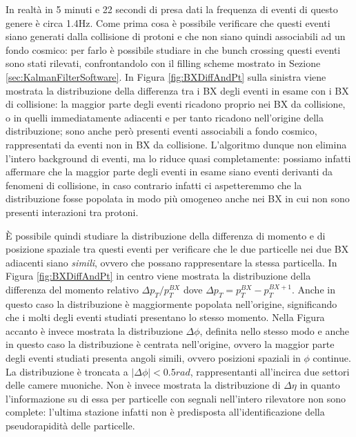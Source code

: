 In realtà in 5 minuti e 22 secondi di presa dati la frequenza di eventi di questo genere è circa 1.4Hz. Come prima cosa è possibile verificare che questi eventi siano generati dalla collisione di protoni e che non siano quindi associabili ad un fondo cosmico: per farlo è possibile studiare in che bunch crossing questi eventi sono stati rilevati, confrontandolo con il filling scheme mostrato in Sezione \ref{sec:KalmanFilterSoftware}. In Figura \ref{fig:BXDiffAndPt} sulla sinistra viene mostrata la distribuzione della differenza tra i BX degli eventi in esame con i BX di collisione: la maggior parte degli eventi ricadono proprio nei BX da collisione, o in quelli immediatamente adiacenti e per tanto ricadono nell'origine della distribuzione; sono anche però presenti eventi associabili a fondo cosmico, rappresentati da eventi non in BX da collisione. L'algoritmo dunque non elimina l'intero background di eventi, ma lo riduce quasi completamente: possiamo infatti affermare che la maggior parte degli eventi in esame siano eventi derivanti da fenomeni di collisione, in caso contrario infatti ci aspetteremmo che la distribuzione fosse popolata in modo più omogeneo anche nei BX in cui non sono presenti interazioni tra protoni.

È possibile quindi studiare la distribuzione della differenza di momento e di posizione spaziale tra questi eventi per verificare che le due particelle nei due BX adiacenti siano \textit{simili}, ovvero che possano rappresentare la stessa particella. In Figura \ref{fig:BXDiffAndPt} in centro viene mostrata la distribuzione della differenza del momento relativo $\Delta p_T/p_T^{BX}$ dove $\Delta p_T = p_T^{BX} - p_T^{BX+1}$. Anche in questo caso la distribuzione è maggiormente popolata nell'origine, significando che i molti degli eventi studiati presentano lo stesso momento. \newline
Nella Figura accanto è invece mostrata la distribuzione $\Delta \phi$, definita nello stesso modo e anche in questo caso la distribuzione è centrata nell'origine, ovvero la maggior parte degli eventi studiati presenta angoli simili, ovvero posizioni spaziali in $\phi$ continue. La distribuzione è troncata a $|\Delta \phi| < 0.5 \si{rad}$, rappresentanti all'incirca due settori delle camere muoniche. \newline
Non è invece mostrata la distribuzione di $\Delta \eta$ in quanto l'informazione su di essa per particelle con segnali nell'intero rilevatore non sono complete: l'ultima stazione infatti non è predisposta all'identificazione della pseudorapidità delle particelle. 



